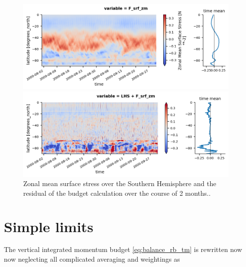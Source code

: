 \documentclass[11pt]{article}
\numberwithin{equation}{section}
\begin{document}
\begin{figure}[h!]
\centerline{\includegraphics[scale=.8]{F_srf_zm.png}}
\centerline{\includegraphics[scale=.8]{residual.png}}
\caption{Zonal mean surface stress over the Southern Hemisphere and the residual of the budget calculation over the course of 2 months..}
\label{fig:AM_example3}
\end{figure}


\section{Simple limits}
The vertical integrated momentum budget \eqref{eq:balance_rb_tm} is rewritten now now neglecting all complicated averaging and weightings as
\end{document}
